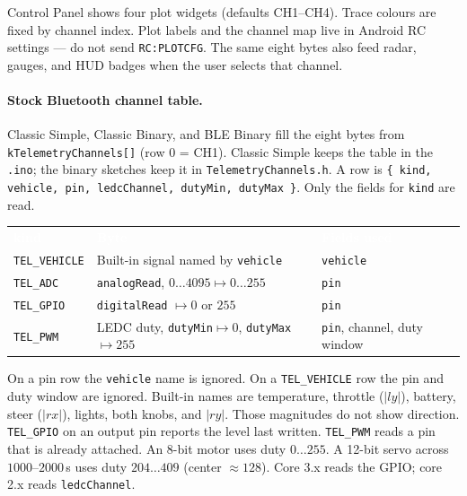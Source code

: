 \documentclass[12pt,a4paper]{article}
\newcommand{\thc}[1]{\textcolor{white}{\bfseries #1}}
\begin{document}
Control Panel shows four plot widgets (defaults CH1--CH4). Trace colours are
fixed by channel index. Plot labels and the channel map live in Android RC
settings --- do not send \texttt{RC:PLOTCFG}. The same eight bytes also feed
radar, gauges, and HUD badges when the user selects that channel.

\paragraph{Stock Bluetooth channel table.}
Classic Simple, Classic Binary, and BLE Binary fill the eight bytes from
\texttt{kTelemetryChannels[]} (row 0 = CH1). Classic Simple keeps the table
in the \texttt{.ino}; the binary sketches keep it in \texttt{TelemetryChannels.h}.
A row is \texttt{\{ kind, vehicle, pin, ledcChannel, dutyMin, dutyMax \}}.
Only the fields for \texttt{kind} are read.

\begin{center}
\renewcommand{\arraystretch}{1.25}
\setlength{\tabcolsep}{4pt}
\begin{tabular}{>{\raggedright\arraybackslash}p{2.6cm}
                >{\raggedright\arraybackslash}p{6.2cm}
                >{\raggedright\arraybackslash}p{4.6cm}}
\rowcolor{TblHead}
\thc{kind} & \thc{Byte} & \thc{Fields used} \\
\rowcolor{TblChan}
\texttt{TEL\_VEHICLE} & Built-in signal named by \texttt{vehicle} & \texttt{vehicle} \\
\rowcolor{TblTelem}
\texttt{TEL\_ADC} & \texttt{analogRead}, $0\ldots 4095 \mapsto 0\ldots 255$ & \texttt{pin} \\
\rowcolor{TblSw}
\texttt{TEL\_GPIO} & \texttt{digitalRead} $\mapsto 0$ or $255$ & \texttt{pin} \\
\rowcolor{TblKnob}
\texttt{TEL\_PWM} & LEDC duty, \texttt{dutyMin}$\mapsto 0$, \texttt{dutyMax}$\mapsto 255$ & \texttt{pin}, channel, duty window \\
\end{tabular}
\end{center}

On a pin row the \texttt{vehicle} name is ignored. On a \texttt{TEL\_VEHICLE}
row the pin and duty window are ignored. Built-in names are temperature,
throttle ($\lvert ly\rvert$), battery, steer ($\lvert rx\rvert$), lights,
both knobs, and $\lvert ry\rvert$. Those magnitudes do not show direction.
\texttt{TEL\_GPIO} on an output pin reports the level last written.
\texttt{TEL\_PWM} reads a pin that is already attached. An 8-bit motor uses
duty $0\ldots 255$. A 12-bit servo across $1000$--$2000$\,\textmu s uses duty
$204\ldots 409$ (center $\approx 128$). Core 3.x reads the GPIO; core 2.x
reads \texttt{ledcChannel}.
\end{document}
